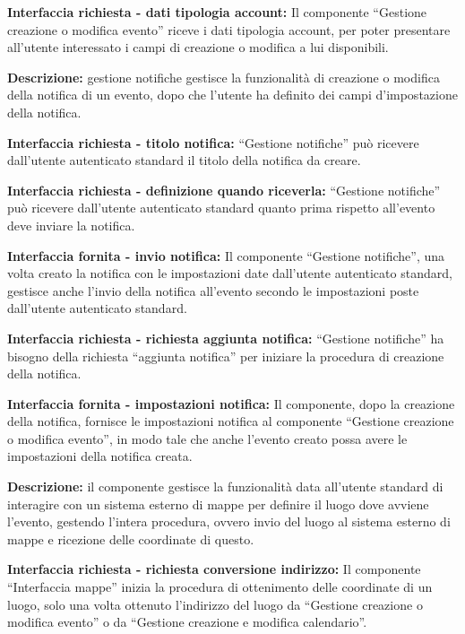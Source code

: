 \begin{listaPersonale}[DCI]{}
    \textbf{Interfaccia richiesta - dati tipologia account:} Il componente “Gestione creazione o modifica evento” riceve i dati tipologia account, per poter presentare all'utente interessato i campi di creazione o modifica a lui disponibili.



    \textbf{Descrizione:} gestione notifiche gestisce la funzionalità di creazione o modifica della notifica di un evento, dopo che l'utente ha definito dei campi d'impostazione della notifica.

    \textbf{Interfaccia richiesta - titolo notifica:} “Gestione notifiche” può ricevere dall'utente autenticato standard il titolo della notifica da creare.

    \textbf{Interfaccia richiesta - definizione quando riceverla:} “Gestione notifiche” può ricevere dall'utente autenticato standard quanto prima rispetto all'evento deve inviare la notifica.

    \textbf{Interfaccia fornita - invio notifica:} Il componente “Gestione notifiche”, una volta creato la notifica con le impostazioni date dall'utente autenticato standard, gestisce anche l'invio della notifica all'evento secondo le impostazioni poste dall'utente autenticato standard.

    \textbf{Interfaccia richiesta - richiesta aggiunta notifica:} “Gestione notifiche” ha bisogno della richiesta “aggiunta notifica” per iniziare la procedura di creazione della notifica.

    \textbf{Interfaccia fornita - impostazioni notifica:} Il componente, dopo la creazione della notifica, fornisce le impostazioni notifica al componente “Gestione creazione o modifica evento”, in modo tale che anche l'evento creato possa avere le impostazioni della notifica creata.



    \textbf{Descrizione:} il componente gestisce la funzionalità data all'utente standard di interagire con un sistema esterno di mappe per definire il luogo dove avviene l'evento, gestendo l'intera procedura, ovvero invio del luogo al sistema esterno di mappe e ricezione delle coordinate di questo.

    \textbf{Interfaccia richiesta - richiesta conversione indirizzo:}   Il componente “Interfaccia mappe” inizia la procedura di ottenimento delle coordinate di un luogo, solo una volta ottenuto l'indirizzo del luogo da “Gestione creazione o modifica evento” o da “Gestione creazione e modifica calendario”.


\end{listaPersonale}
